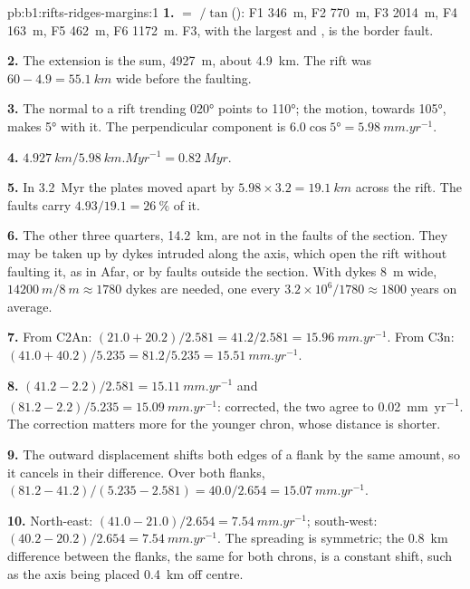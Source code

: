 \begin{solution}{pb:b1:rifts-ridges-margins:1}
\textbf{1.}  $= $ $/\tan$(): F1 \qty{346}{m}, F2 \qty{770}{m},
F3 \qty{2014}{m}, F4 \qty{163}{m}, F5 \qty{462}{m}, F6 \qty{1172}{m}. F3, with
the largest  and , is the border fault.

\textbf{2.} The extension is the sum, \qty{4927}{m}, about \qty{4.9}{km}. The
rift was $60 - 4.9 = \qty{55.1}{km}$ wide before the faulting.

\textbf{3.} The normal to a rift trending \ang{020} points to \ang{110}; the
motion, towards \ang{105}, makes \ang{5} with it. The perpendicular component
is $6.0\cos\ang{5} = \qty{5.98}{mm.yr^{-1}}$.

\textbf{4.} $\qty{4.927}{km}/\qty{5.98}{km.Myr^{-1}} = \qty{0.82}{Myr}$.

\textbf{5.} In \qty{3.2}{Myr} the plates moved apart by
$5.98\times3.2 = \qty{19.1}{km}$ across the rift. The faults carry
$4.93/19.1 = \qty{26}{\percent}$ of it.

\textbf{6.} The other three quarters, \qty{14.2}{km}, are not in the faults of
the section. They may be taken up by dykes intruded along the axis, which open
the rift without faulting it, as in Afar, or by faults outside the section.
With dykes \qty{8}{m} wide, $\qty{14200}{m}/\qty{8}{m} \approx 1780$ dykes are
needed, one every $3.2\times10^6/1780 \approx 1800$ years on average.

\textbf{7.} From C2An: $(21.0 + 20.2)/2.581 = 41.2/2.581 =
\qty{15.96}{mm.yr^{-1}}$. From C3n: $(41.0 + 40.2)/5.235 = 81.2/5.235 =
\qty{15.51}{mm.yr^{-1}}$.

\textbf{8.} $(41.2 - 2.2)/2.581 = \qty{15.11}{mm.yr^{-1}}$ and
$(81.2 - 2.2)/5.235 = \qty{15.09}{mm.yr^{-1}}$: corrected, the two agree to
\qty{0.02}{mm.yr^{-1}}. The correction matters more for the younger chron, whose
distance is shorter.

\textbf{9.} The outward displacement shifts both edges of a flank by the same
amount, so it cancels in their difference. Over both flanks,
$(81.2 - 41.2)/(5.235 - 2.581) = 40.0/2.654 = \qty{15.07}{mm.yr^{-1}}$.

\textbf{10.} North-east: $(41.0 - 21.0)/2.654 = \qty{7.54}{mm.yr^{-1}}$;
south-west: $(40.2 - 20.2)/2.654 = \qty{7.54}{mm.yr^{-1}}$. The spreading is
symmetric; the \qty{0.8}{km} difference between the flanks, the same for both
chrons, is a constant shift, such as the axis being placed \qty{0.4}{km} off
centre.


\end{solution}
